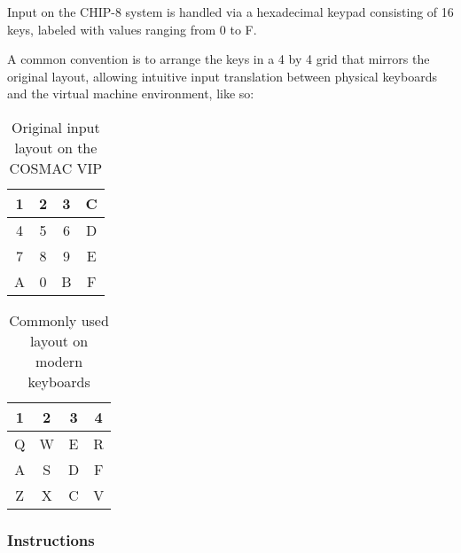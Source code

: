 \par Input on the CHIP-8 system is handled via a hexadecimal keypad consisting of 16 keys, labeled with values ranging from 0 to F.

\par A common convention is to arrange the keys in a 4 by 4 grid that mirrors the original layout, allowing intuitive input translation between physical keyboards and the virtual machine environment, like so:

\begin{table}[H]
\centering
\begin{tabular}{| c | c | c | c |}
\hline
1 & 2 & 3 & C \\ \hline
4 & 5 & 6 & D \\ \hline
7 & 8 & 9 & E \\ \hline
A & 0 & B & F \\ \hline
\end{tabular}
\caption{Original input layout on the COSMAC VIP}
\end{table}

\begin{table}[H]
\centering
\begin{tabular}{| c | c | c | c |}
\hline
1 & 2 & 3 & 4 \\ \hline
Q & W & E & R \\ \hline
A & S & D & F \\ \hline
Z & X & C & V \\ \hline
\end{tabular}
\caption{Commonly used layout on modern keyboards}
\end{table}

\subsubsection{Instructions}

